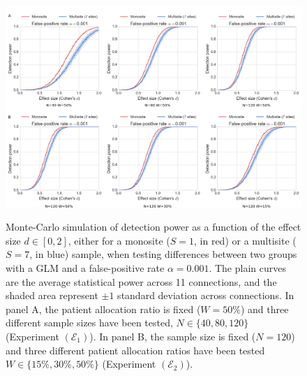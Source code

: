 \documentclass[authoryear]{elsarticle}
\begin{document}
\begin{figure}[tbp]
\centering
{\includegraphics[width=\textwidth]{../figures/simulations_real_7sites.png}}

\caption{
Monte-Carlo simulation of detection power as a function of the effect size $d\in[0,2]$, either for a monosite ($S=1$, in red) or a multisite ($S=7$, in blue) sample, when testing differences between two groups with a GLM and a false-positive rate $\alpha=0.001$. The plain curves are the average statistical power across 11 connections, and the shaded area represent $\pm 1$ standard deviation across connections. In panel A, the patient allocation ratio is fixed ($W=50\%$) and three different sample sizes have been tested, $N\in\{40, 80, 120\}$ (Experiment $(\mathcal{E}_1)$). In panel B, the sample size is fixed ($N=120$) and three different patient allocation ratios have been tested $W\in \{15\%, 30\%,50\%\}$ (Experiment $(\mathcal{E}_2)$).
}
\label{fig_real_sim}
\end{figure}
\end{document}
